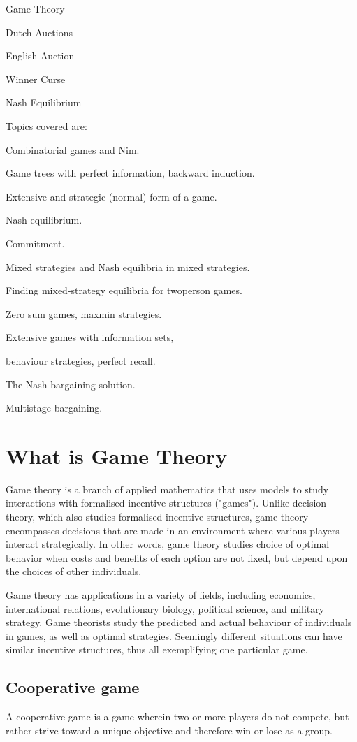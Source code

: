 Game Theory

Dutch Auctions

English Auction

Winner Curse

Nash Equilibrium


Topics covered are:

Combinatorial games and Nim.

Game trees with perfect information, backward induction.

Extensive and strategic (normal) form of a game.

Nash equilibrium.

Commitment.

Mixed strategies and Nash equilibria in mixed strategies.

Finding mixed-strategy equilibria for twoperson games.

Zero sum games, maxmin strategies.

Extensive games with information sets,

behaviour strategies, perfect recall.

The Nash bargaining solution.

Multistage bargaining.

\section{What is Game Theory}

Game theory is a branch of applied mathematics that uses models to study interactions with formalised incentive structures ("games"). 
Unlike decision theory, which also studies formalised incentive structures, game theory encompasses decisions that are made in an environment where various players interact strategically.
In other words, game theory studies choice of optimal behavior when costs and benefits of each option are not fixed, but depend upon the choices of other individuals.

Game theory has applications in a variety of fields, including economics,  international relations, evolutionary biology, political science, and  military strategy. Game theorists study the predicted and actual  behaviour of individuals in games, as well as optimal strategies.  Seemingly different situations can have similar incentive  structures, thus all exemplifying one particular game. 

\subsection{Cooperative game}
A cooperative game is a game wherein two or more players do not compete, but rather strive toward a unique objective and therefore win or lose as a group.

